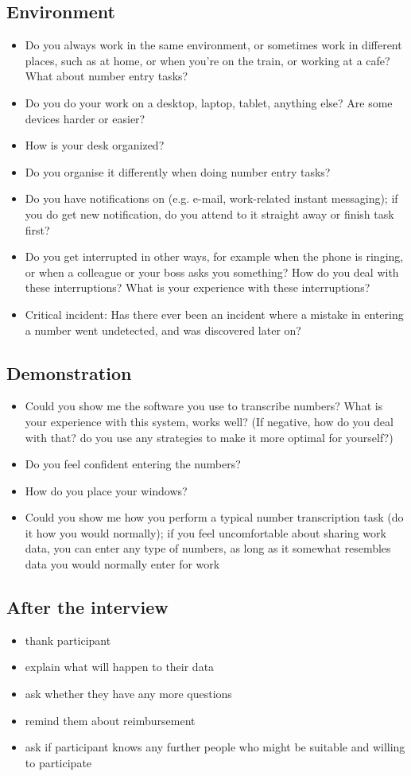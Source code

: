 \subsection{Environment}
\begin{itemize}
\item Do you always work in the same environment, or sometimes work in different places, such as at home, or when you're on the train, or working at a cafe? What about number entry tasks?
\item Do you do your work on a desktop, laptop, tablet, anything else? Are some devices harder or easier?
\item How is your desk organized?
\item Do you organise it differently when doing number entry tasks?
\item Do you have notifications on (e.g. e-mail, work-related instant messaging); if you do get new notification, do you attend to it straight away or finish task first?
\item Do you get interrupted in other ways, for example when the phone is ringing, or when a colleague or your boss asks you something? How do you deal with these interruptions? What is your experience with these interruptions?
\item Critical incident: Has there ever been an incident where a mistake in entering a number went undetected, and was discovered later on?
\end{itemize}

\subsection{Demonstration}
\begin{itemize}
\item Could you show me the software you use to transcribe numbers?
What is your experience with this system, works well?
(If negative, how do you deal with that? do you use any strategies to make it more optimal for yourself?)
\item Do you feel confident entering the numbers?
\item How do you place your windows?
\item Could you show me how you perform a typical number transcription task (do it how you would normally); if you feel uncomfortable about sharing work data, you can enter any type of numbers, as long as it somewhat resembles data you would normally enter for work
\end{itemize}
\subsection{After the interview}
\begin{itemize}
\item thank participant
\item explain what will happen to their data
\item ask whether they have any more questions
\item remind them about reimbursement
\item ask if participant knows any further people who might be suitable and willing to participate
\end{itemize}

